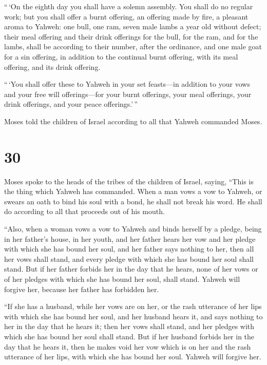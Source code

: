  ``\,`On the eighth day you shall have a solemn assembly.
You shall do no regular work;  but you shall offer a burnt
offering, an offering made by fire, a pleasant aroma to Yahweh: one
bull, one ram, seven male lambs a year old without defect; 
their meal offering and their drink offerings for the bull, for the ram,
and for the lambs, shall be according to their number, after the
ordinance,  and one male goat for a sin offering, in
addition to the continual burnt offering, with its meal offering, and
its drink offering.

 ``\,`You shall offer these to Yahweh in your set
feasts---in addition to your vows and your free will offerings---for
your burnt offerings, your meal offerings, your drink offerings, and
your peace offerings.'\,''

 Moses told the children of Israel according to all that
Yahweh commanded Moses.

\hypertarget{section-29}{%
\section{30}\label{section-29}}

 Moses spoke to the heads of the tribes of the children of
Israel, saying, ``This is the thing which Yahweh has commanded.
 When a man vows a vow to Yahweh, or swears an oath to bind
his soul with a bond, he shall not break his word. He shall do according
to all that proceeds out of his mouth.

 ``Also, when a woman vows a vow to Yahweh and binds herself
by a pledge, being in her father's house, in her youth,  and
her father hears her vow and her pledge with which she has bound her
soul, and her father says nothing to her, then all her vows shall stand,
and every pledge with which she has bound her soul shall stand.
 But if her father forbids her in the day that he hears,
none of her vows or of her pledges with which she has bound her soul,
shall stand. Yahweh will forgive her, because her father has forbidden
her.

 ``If she has a husband, while her vows are on her, or the
rash utterance of her lips with which she has bound her soul,
 and her husband hears it, and says nothing to her in the
day that he hears it; then her vows shall stand, and her pledges with
which she has bound her soul shall stand.  But if her
husband forbids her in the day that he hears it, then he makes void her
vow which is on her and the rash utterance of her lips, with which she
has bound her soul. Yahweh will forgive her.

